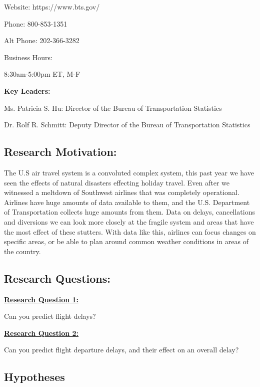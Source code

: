 \documentclass[a4paper,12pt]{article}
\begin{document}
Website: https://www.bts.gov/

Phone: 800-853-1351

Alt Phone: 202-366-3282

Business Hours:

8:30am-5:00pm ET, M-F

\textbf{Key Leaders:}

Ms. Patricia S. Hu: Director of the Bureau of Transportation Statistics

Dr. Rolf R. Schmitt: Deputy Director of the Bureau of Transportation Statistics

\subsection{Research Motivation:}

The U.S air travel system is a convoluted complex system, this past year we have seen the
effects of natural disasters effecting holiday travel. Even after we witnessed a meltdown of
Southwest airlines that was completely operational. Airlines have huge amounts of data
available to them, and the U.S. Department of Transportation collects huge amounts from
them. Data on delays, cancellations and diversions we can look more closely at the fragile
system and areas that have the most effect of these stutters. With data like this, airlines can
focus changes on specific areas, or be able to plan around common weather conditions in areas
of the country.

\subsection{Research Questions:}

\textbf{\underline{Research Question 1:}} \label{rq1}

Can you predict flight delays?

\noindent \textbf{\underline{Research Question 2:}} \label{rq2}

Can you predict flight departure delays, and their effect on an overall delay?



\subsection{Hypotheses}
\end{document}
